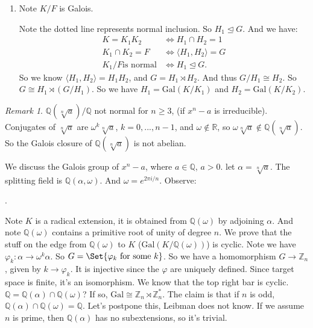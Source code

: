 \documentclass[9pt,reqno,twoside]{amsbook}
\theoremstyle{plain}
\numberwithin{section}{chapter}
\numberwithin{equation}{chapter}
\theoremstyle{definition}
\theoremstyle{remark}
\newtheorem{rem}[theorem]{Remark}
\theoremstyle{plain}
\newcommand{\norm}{\trianglelefteq}
\newcommand{\semi}{\rtimes}
\newcommand{\R}{\mathbb{R}}
\newcommand{\z}{\mathbb{Z}}
\newcommand{\Q}{\mathbb{Q}}
\newcommand{\bee}{\begin{equation}\begin{aligned}}
\newcommand{\eee}{\end{aligned}\end{equation}}
\newcommand{\gal}{\mathrm{Gal}}
\newcommand{\wer}{\sqrt}
\renewcommand{\geq}{\geqslant}
\renewcommand{\phi}{\varphi}
\begin{document}
\begin{enumerate}[label=\arabic*.]
\item 
Note $K/F$ is Galois. 
\begin{center}
\end{center}
Note the dotted line represents normal inclusion. So $H_1 \norm G$. And we have:
\bee
K = K_1K_2 &\iff H_1 \cap H_2 = 1\\
K_1 \cap K_2 = F &\iff \langle H_1,H_2 \rangle = G\\
K_1/F \text{is normal} &\iff H_1 \norm G.
\eee
So we know $\langle H_1,H_2 \rangle = H_1H_2$, and $G = H_1 \semi H_2$. And thus $G/H_1 \cong H_2$. So $G \cong H_1 \semi (G/H_1)$. 
So we have $H_1 = \gal(K/K_1)$ and $H_2 = \gal(K/K_2)$. 

\end{enumerate}

\begin{rem}
$\Q(\wer[n]{a})/\Q$ not normal for $n \geq 3$, (if $x^n - a$ is irreducible). Conjugates of $\wer[n]{a}$ are $\omega^k\wer[n]{a}$, $k = 0,...,n - 1$, and $\omega \notin \R$, so $\omega\wer[n]{a} \notin\Q(\wer[n]{a})$. So the Galois closure of $\Q(\wer[n]{a})$ is not abelian. 
\end{rem}

We discuss the Galois group of $x^n - a$, where $a \in \Q$, $a > 0$. let $\alpha = \wer[n]{a}$. The splitting field is $\Q(\alpha,\omega)$. And $\omega = e^{2\pi i/n}$. 
Observe:
\begin{center}
.
\end{center}
Note $K$ is a radical extension, it is obtained from $\Q(\omega)$ by adjoining $\alpha$. And note $\Q(\omega)$ contains a primitive root of unity of degree $n$. We prove that the stuff on the edge from $\Q(\omega)$ to $K$ ($\gal(K/\Q(\omega))$) is cyclic. Note we have $\phi_k:\alpha \to \omega^k\alpha$. So $G = \Set{\phi_k \text{ for some } k}$. So we have a homomorphism $G \to \z_n$, given by $k \to \phi_k$. It is injective since the $\phi$ are uniquely defined. Since target space is finite, it's an isomorphism.  We know that the top right bar is cyclic. 
$\Q = \Q(\alpha) \cap \Q(\omega)$?
If so, $\gal \cong \z_n \semi \z_n^*$. The claim is that if $n$ is odd, $\Q(\alpha) \cap \Q(\omega) = \Q$. Let's postpone this, Leibman does not know. If we assume $n$ is prime, then $\Q(\alpha)$ has no subextensions, so it's trivial. 
\end{document}
